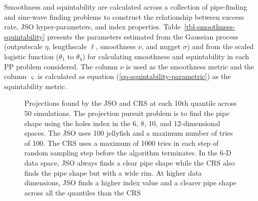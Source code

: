 \documentclass[
  12pt,
]{interact}
\theoremstyle{plain}
\begin{document}
Smoothness and squintability are calculated across a collection of
pipe-finding and sine-wave finding problems to construct the
relationship between success rate, JSO hyper-parameters, and index
properties. Table~\ref{tbl-smoothness-squintability} presents the
parameters estimated from the Gaussian process (outputscale \(\eta\),
lengthscale \(\ell\), smoothness \(\nu\), and nugget \(\sigma\)) and
from the scaled logistic function (\(\theta_1\) to \(\theta_4\)) for
calculating smoothness and squintability in each PP problem considered.
The column \(\nu\) is used as the smoothness metric and the column
\(\varsigma\) is calculated as equation
(\ref{eq-squintability-parametric}) as the squintability metric.

\begin{figure}


\caption{\label{fig-proj}Projections found by the JSO and CRS at each
10th quantile across 50 simulations. The projection pursuit problem is
to find the pipe shape using the holes index in the 6, 8, 10, and
12-dimensional spaces. The JSO uses 100 jellyfish and a maximum number
of tries of 100. The CRS uses a maximum of 1000 tries in each step of
random sampling step before the algorithm terminates. In the 6-D data
space, JSO always finds a clear pipe shape while the CRS also finds the
pipe shape but with a wide rim. At higher data dimensions, JSO finds a
higher index value and a clearer pipe shape across all the quantiles
than the CRS}

\end{figure}%
\end{document}
